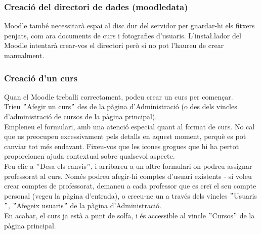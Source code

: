 \documentclass[a4paper]{report}  %
\begin{document}
\subsubsection{Creació del directori de dades (moodledata)}
Moodle també necessitarà espai al disc dur del servidor per guardar-hi els fitxers penjats, com ara documents de curs i fotografies d'usuaris. L'insta\l.lador del Moodle intentarà crear-vos el directori però si no pot l'haureu de crear manualment. 
\subsubsection{Creació d'un curs}
Quan el Moodle treballi correctament, podeu crear un curs per començar.\\
Trieu $"$Afegir un curs$"$ des de la pàgina d'Administració (o des dels vincles d'administració de cursos de la pàgina principal).\\ 
Empleneu el formulari, amb una atenció especial quant al format de curs. No cal que us preocupeu excessivament pels detalls en aquest moment, perquè es pot canviar tot més endavant. Fixeu-vos que les icones grogues que hi ha pertot proporcionen ajuda contextual sobre qualsevol aspecte.\\ 
Feu clic a $"$Desa els canvis$"$, i arribareu a un altre formulari on podreu assignar professorat al curs. Només podreu afegir-hi comptes d'usuari existents - si voleu crear comptes de professorat, demaneu a cada professor que es creï el seu compte personal (vegeu la pàgina d'entrada), o creeu-ne un a través dels vincles $"$Usuaris$"$, $"$Afegeix usuaris$"$ de la pàgina d'Administració.\\
En acabar, el curs ja està a punt de solfa, i és accessible al vincle $"$Cursos$"$ de la pàgina principal.\\ 
\end{document}
